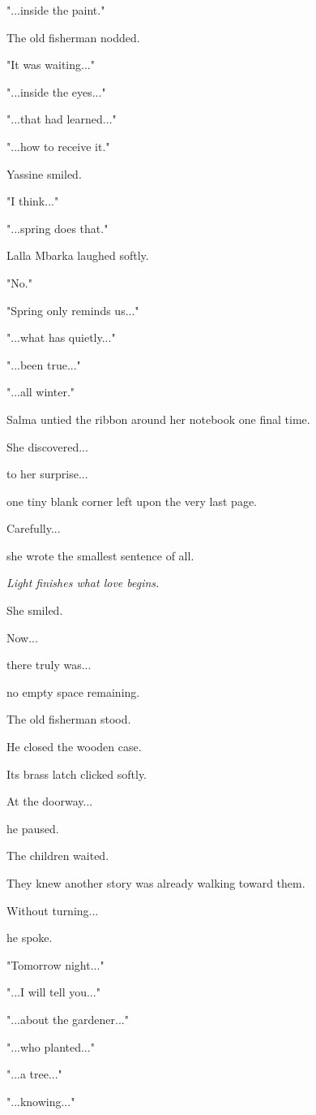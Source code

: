 \documentclass[12pt,openany]{book}
\begin{document}
"...inside the paint."

The old fisherman nodded.

"It was waiting..."

"...inside the eyes..."

"...that had learned..."

"...how to receive it."

Yassine smiled.

"I think..."

"...spring does that."

Lalla Mbarka laughed softly.

"No."

"Spring only reminds us..."

"...what has quietly..."

"...been true..."

"...all winter."

Salma untied the ribbon around her notebook one final time.

She discovered...

to her surprise...

one tiny blank corner left upon the very last page.

Carefully...

she wrote the smallest sentence of all.

\emph{Light finishes what love begins.}

She smiled.

Now...

there truly was...

no empty space remaining.

The old fisherman stood.

He closed the wooden case.

Its brass latch clicked softly.

At the doorway...

he paused.

The children waited.

They knew another story was already walking toward them.

Without turning...

he spoke.

"Tomorrow night..."

"...I will tell you..."

"...about the gardener..."

"...who planted..."

"...a tree..."

"...knowing..."
\end{document}
